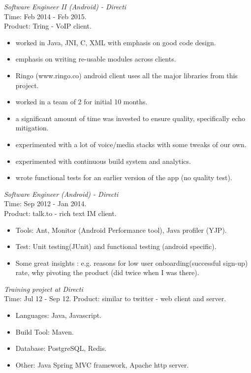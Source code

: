 \documentclass[margin,line]{resume}
\begin{document}
\begin{resume}
\textit{Software Engineer II (Android) - Directi} \\
Time: Feb 2014 - Feb 2015.\\
Product: Tring - VoIP client.\\
\begin{itemize}
	\item worked in Java, JNI, C, XML with emphasis on good code design.
	\item emphasis on writing re-usable modules across clients.
        \item Ringo (www.ringo.co) android client uses all the major libraries from this project.
        \item worked in a team of 2 for initial 10 months.
	\item a significant amount of time was invested to ensure quality, specifically echo mitigation.
	\item experimented with a lot of voice/media stacks with some tweaks of our own.
	\item experimented with continuous build system and analytics.
	\item wrote functional tests for an earlier version of the app (no quality test). 
 \end{itemize}

\textit{Software Engineer (Android) - Directi} \\
Time: Sep 2012 - Jan 2014.\\
Product: talk.to - rich text IM client.\\
\begin{itemize}
\item Tools: Ant, Monitor (Android Performance tool), Java profiler (YJP).
\item Test: Unit testing(JUnit) and functional testing (android specific).
\item Some great insights : e.g. reasons for low user onboarding(successful sign-up) rate, why pivoting the product (did twice when I was there).
\end{itemize}

\textit{Training project at Directi}\\
Time: Jul 12 - Sep 12.
Product: similar to twitter - web client and server.\\
 \begin{itemize}
\item Languages: Java, Javascript.
\item Build Tool: Maven.
\item Database: PostgreSQL, Redis.
\item Other: Java Spring MVC framework, Apache http server.  
 \end{itemize}


\end{resume}
\end{document}
